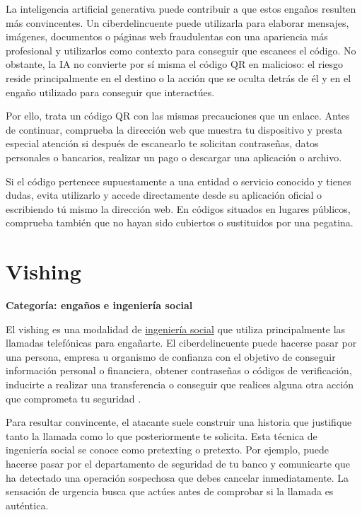\documentclass[
  spanish,
  a4paper,
  openany]{book}
\begin{document}
La inteligencia artificial generativa puede contribuir a que estos engaños resulten más convincentes. Un ciberdelincuente puede utilizarla para elaborar mensajes, imágenes, documentos o páginas web fraudulentas con una apariencia más profesional y utilizarlos como contexto para conseguir que escanees el código. No obstante, la IA no convierte por sí misma el código QR en malicioso: el riesgo reside principalmente en el destino o la acción que se oculta detrás de él y en el engaño utilizado para conseguir que interactúes.

Por ello, trata un código QR con las mismas precauciones que un enlace. Antes de continuar, comprueba la dirección web que muestra tu dispositivo y presta especial atención si después de escanearlo te solicitan contraseñas, datos personales o bancarios, realizar un pago o descargar una aplicación o archivo.

Si el código pertenece supuestamente a una entidad o servicio conocido y tienes dudas, evita utilizarlo y accede directamente desde su aplicación oficial o escribiendo tú mismo la dirección web. En códigos situados en lugares públicos, comprueba también que no hayan sido cubiertos o sustituidos por una pegatina.

\section{Vishing}\label{vishing}

\textbf{Categoría: engaños e ingeniería social}

El vishing es una modalidad de \href{https://es.wikipedia.org/wiki/Ingeniería_social_(seguridad_informática)}{ingeniería social} que utiliza principalmente las llamadas telefónicas para engañarte. El ciberdelincuente puede hacerse pasar por una persona, empresa u organismo de confianza con el objetivo de conseguir información personal o financiera, obtener contraseñas o códigos de verificación, inducirte a realizar una transferencia o conseguir que realices alguna otra acción que comprometa tu seguridad \citep{WIKI-vishing}.

Para resultar convincente, el atacante suele construir una historia que justifique tanto la llamada como lo que posteriormente te solicita. Esta técnica de ingeniería social se conoce como pretexting o pretexto. Por ejemplo, puede hacerse pasar por el departamento de seguridad de tu banco y comunicarte que ha detectado una operación sospechosa que debes cancelar inmediatamente. La sensación de urgencia busca que actúes antes de comprobar si la llamada es auténtica.
\end{document}
